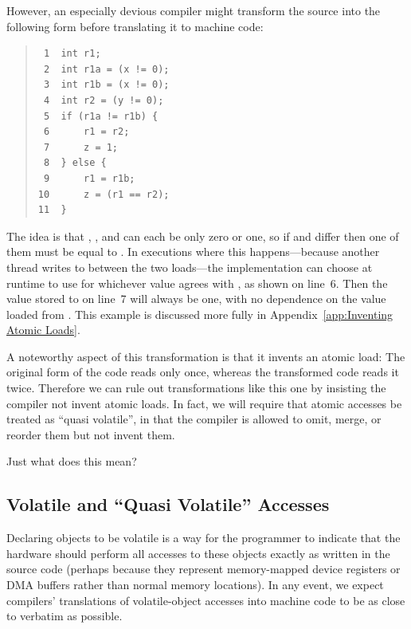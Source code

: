 \documentclass[10]{article}
\begin{document}
However, an especially devious compiler might transform the source into
the following form before translating it to machine code:
\begin{quote}
\begin{verbatim}
 1  int r1;
 2  int r1a = (x != 0);
 3  int r1b = (x != 0);
 4  int r2 = (y != 0);
 5  if (r1a != r1b) {
 6      r1 = r2;
 7      z = 1;
 8  } else {
 9      r1 = r1b;
10      z = (r1 == r2);
11  }
\end{verbatim}
\end{quote}
The idea is that , , and  can each be only zero or one,
so if  and  differ then one of them must be equal to .
In executions where this happens---because another thread writes to 
between the two loads---the implementation can choose at runtime to use
for  whichever value agrees with , as shown on line~6.
Then the value stored to  on line~7 will always be one,
with no dependence on the value loaded from .
This example is discussed more fully in
Appendix~\ref{app:Inventing Atomic Loads}.

A noteworthy aspect of this transformation is that it invents an atomic load:
The original form of the code reads  only once,
whereas the transformed code reads it twice.
Therefore we can rule out transformations like this one by insisting
the compiler not invent atomic loads.
In fact, we will require that atomic accesses be treated as
``quasi volatile'', in that the compiler is allowed to omit,
merge, or reorder them but not invent them.

Just what does this mean?

\subsection{Volatile and ``Quasi Volatile'' Accesses}
\label{sec:Volatile and Quasi Volatile Accesses}

Declaring objects to be volatile is a way for the programmer to
indicate that the hardware should perform all accesses to these
objects exactly as written in the source code (perhaps because they
represent memory-mapped device registers or DMA buffers rather than
normal memory locations).
In any event, we expect compilers' translations of volatile-object accesses
into machine code to be as close to verbatim as possible.
\end{document}
